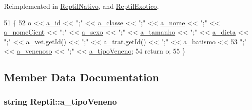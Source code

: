 Reimplemented in \hyperlink{classReptilNativo_ae44fd929f6ca100781d7304802865203}{Reptil\+Nativo}, and \hyperlink{classReptilExotico_a24e184c97d40c3e9eec065a156db3703}{Reptil\+Exotico}.


\begin{DoxyCode}
51 \{
52     o << \hyperlink{classAnimal_a1eab12d1133a739dc0fea720cf6cc927}{a\_id} << \textcolor{stringliteral}{";"} << \hyperlink{classAnimal_a1f32b4455559489b5f5dce71913a6f8f}{a\_classe} << \textcolor{stringliteral}{";"} << \hyperlink{classAnimal_ad815bbe345d7c5274858ac8ccb24bc52}{a\_nome} << \textcolor{stringliteral}{";"} << 
      \hyperlink{classAnimal_af2ae0fc23b0eaf3edaee4579f6199dfc}{a\_nomeCient} << \textcolor{stringliteral}{";"} << \hyperlink{classAnimal_af2b1c520d145f82af7a5a88bb4271a0d}{a\_sexo} << \textcolor{stringliteral}{";"} << \hyperlink{classAnimal_a72366b060dfdbc0dd074fbe41decfcc2}{a\_tamanho} << \textcolor{stringliteral}{";"} << 
      \hyperlink{classAnimal_a32088524517a531af269e3ec04275135}{a\_dieta} << \textcolor{stringliteral}{";"} << \hyperlink{classAnimal_a12ce5681957e27dae674cbbde7fb1e4f}{a\_vet}.\hyperlink{classFuncionario_a0288286a907e587b7ab75d6c23354a06}{getId}() << \textcolor{stringliteral}{";"} << \hyperlink{classAnimal_a19fbf607b29b06a86f598dd1ffb8c712}{a\_trat}.\hyperlink{classFuncionario_a0288286a907e587b7ab75d6c23354a06}{getId}() << \textcolor{stringliteral}{";"} << 
      \hyperlink{classAnimal_a4e308163c5b3d82e546fb39b399bcb71}{a\_batismo} <<
53     \textcolor{stringliteral}{";"} << \hyperlink{classReptil_ab2ebc4cb4f0cf56587b59fdb0d130cf5}{a\_venenoso} << \textcolor{stringliteral}{";"} << \hyperlink{classReptil_ac9ca9b337ca21b72b0ef77b3904b56b7}{a\_tipoVeneno};
54     \textcolor{keywordflow}{return} o;
55 \}
\end{DoxyCode}


\subsection{Member Data Documentation}
\subsubsection[{\texorpdfstring{a\+\_\+tipo\+Veneno}{a_tipoVeneno}}]{\setlength{\rightskip}{0pt plus 5cm}string Reptil\+::a\+\_\+tipo\+Veneno\hspace{0.3cm}{\ttfamily [protected]}}\hypertarget{classReptil_ac9ca9b337ca21b72b0ef77b3904b56b7}{}\label{classReptil_ac9ca9b337ca21b72b0ef77b3904b56b7}


